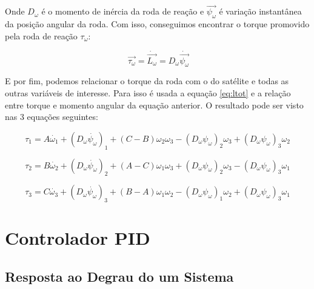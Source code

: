Onde $D_{\omega}$ é o momento de inércia da roda de reação e $\vec{\psi_{\omega}}$ é variação instantânea da posição angular da roda. Com isso, conseguimos encontrar o torque promovido pela roda de reação $\tau_{\omega}$:

\begin{equation}\
\vec{\tau_{\omega}}=\dot{\vec{L_{\omega}}}=D_{\omega}\dot{\vec{\psi_{\omega}}}
\end{equation}

E por fim, podemos relacionar o torque da roda com o do satélite e todas as outras variáveis de interesse. Para isso é usada a equação \ref{eq:ltot} e a relação entre torque e momento angular da equação anterior. O resultado pode ser visto nas 3 equações seguintes:

\begin{equation}\label{eq:torquefinal1}
\tau_{1}=A\dot{\omega_{1}}+(D_{\omega}\dot{\psi_{\omega}})_{1}+(C-B)\omega_{2}\omega_{3}-(D_{\omega}\psi_{\omega})_{2}\omega_{3}+(D_{\omega}\psi_{\omega})_{3}\omega_{2}
\end{equation}

\begin{equation}\label{eq:torquefinal2}
\tau_{2}=B\dot{\omega_{2}}+(D_{\omega}\dot{\psi_{\omega}})_{2}+(A-C)\omega_{1}\omega_{3}+(D_{\omega}\psi_{\omega})_{2}\omega_{3}-(D_{\omega}\psi_{\omega})_{3}\omega_{1}
\end{equation}

\begin{equation}\label{eq:torquefinal3}
\tau_{3}=C\dot{\omega_{3}}+(D_{\omega}\dot{\psi_{\omega}})_{3}+(B-A)\omega_{1}\omega_{2}-(D_{\omega}\psi_{\omega})_{1}\omega_{2}+(D_{\omega}\psi_{\omega})_{3}\omega_{1}
\end{equation}



\section{Controlador PID}

\subsection{Resposta ao Degrau do um Sistema}

